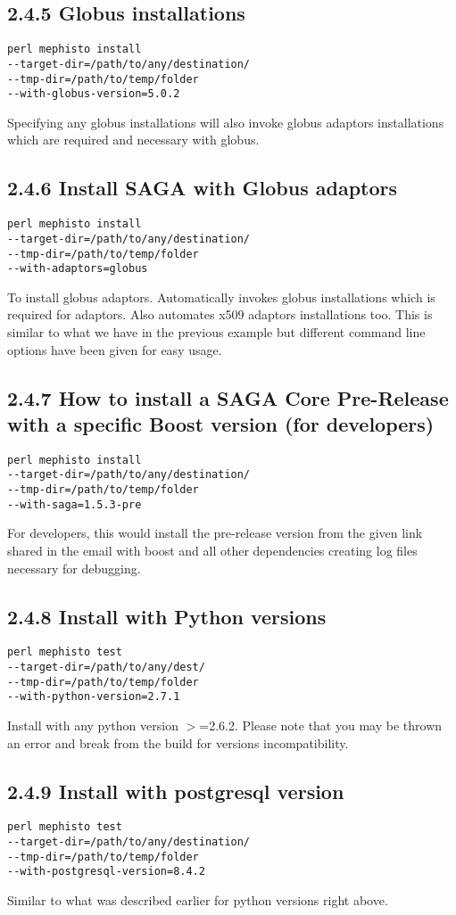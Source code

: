 \documentclass[a4paper,10pt]{article}
\begin{document}
\begin{multicols}{2}
\subsection*{\normalsize 2.4.5 Globus installations}
\begin{verbatim}
perl mephisto install 
--target-dir=/path/to/any/destination/ 
--tmp-dir=/path/to/temp/folder 
--with-globus-version=5.0.2
\end{verbatim}
Specifying any globus installations will also invoke globus adaptors
installations which are required and necessary with globus.
\subsection*{\normalsize 2.4.6 Install SAGA with Globus adaptors}
\begin{verbatim}
perl mephisto install 
--target-dir=/path/to/any/destination/ 
--tmp-dir=/path/to/temp/folder 
--with-adaptors=globus
\end{verbatim}
To install globus adaptors. Automatically invokes globus installations which 
is required for adaptors. Also automates x509 adaptors installations too.
This is similar to what we have in the previous example but different 
command line options have been given for easy usage.  
\subsection*{\normalsize 2.4.7 How to install a SAGA Core Pre-Release with a specific Boost version (for developers)}
\begin{verbatim}
perl mephisto install 
--target-dir=/path/to/any/destination/ 
--tmp-dir=/path/to/temp/folder 
--with-saga=1.5.3-pre
\end{verbatim}
For developers, this would install the pre-release version from the given 
link shared in the email with boost and all other dependencies creating log 
files necessary for debugging. 
\subsection*{\normalsize 2.4.8 Install with Python versions}
\begin{verbatim}
perl mephisto test 
--target-dir=/path/to/any/dest/ 
--tmp-dir=/path/to/temp/folder 
--with-python-version=2.7.1
\end{verbatim}
Install with any python version $>$=2.6.2. Please note that you may 
be thrown an error and break from the build for versions incompatibility.
\subsection*{\normalsize 2.4.9 Install with postgresql version}
\begin{verbatim}
perl mephisto test 
--target-dir=/path/to/any/destination/ 
--tmp-dir=/path/to/temp/folder 
--with-postgresql-version=8.4.2
\end{verbatim}
Similar to what was described earlier for python versions right above.

\end{multicols}
\end{document}
